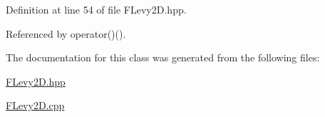 \-Definition at line 54 of file \-F\-Levy2\-D.\-hpp.



\-Referenced by operator()().



\-The documentation for this class was generated from the following files\-:\begin{DoxyCompactItemize}
\item 
\hyperlink{FLevy2D_8hpp}{\-F\-Levy2\-D.\-hpp}\item 
\hyperlink{FLevy2D_8cpp}{\-F\-Levy2\-D.\-cpp}\end{DoxyCompactItemize}
